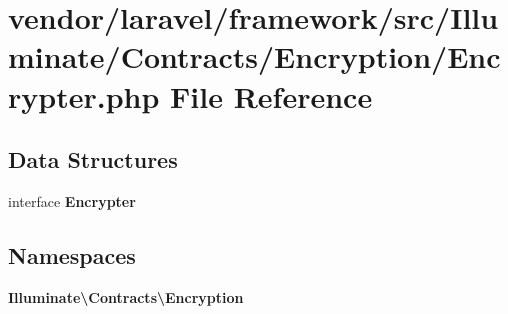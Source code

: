 \section{vendor/laravel/framework/src/\+Illuminate/\+Contracts/\+Encryption/\+Encrypter.php File Reference}
\label{_contracts_2_encryption_2_encrypter_8php}
\subsection*{Data Structures}
\begin{DoxyCompactItemize}
\item 
interface {\bf Encrypter}
\end{DoxyCompactItemize}
\subsection*{Namespaces}
\begin{DoxyCompactItemize}
\item 
 {\bf Illuminate\textbackslash{}\+Contracts\textbackslash{}\+Encryption}
\end{DoxyCompactItemize}
